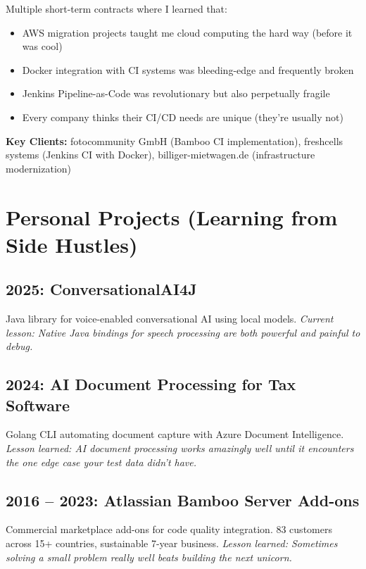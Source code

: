 \documentclass[11pt,a4paper]{article}
\begin{document}
Multiple short-term contracts where I learned that:
\begin{itemize}[leftmargin=15pt, topsep=0pt, itemsep=1pt]
\item AWS migration projects taught me cloud computing the hard way (before it was cool)
\item Docker integration with CI systems was bleeding-edge and frequently broken
\item Jenkins Pipeline-as-Code was revolutionary but also perpetually fragile
\item Every company thinks their CI/CD needs are unique (they're usually not)
\end{itemize}

\textbf{Key Clients:} fotocommunity GmbH (Bamboo CI implementation), freshcells systems (Jenkins CI with Docker), billiger-mietwagen.de (infrastructure modernization)

\vspace{6pt}

\section{Personal Projects (Learning from Side Hustles)}

\subsection{2025: ConversationalAI4J}
Java library for voice-enabled conversational AI using local models. \textit{Current lesson: Native Java bindings for speech processing are both powerful and painful to debug.}

\subsection{2024: AI Document Processing for Tax Software}
Golang CLI automating document capture with Azure Document Intelligence. \textit{Lesson learned: AI document processing works amazingly well until it encounters the one edge case your test data didn't have.}

\subsection{2016 -- 2023: Atlassian Bamboo Server Add-ons}
Commercial marketplace add-ons for code quality integration. 83 customers across 15+ countries, sustainable 7-year business. \textit{Lesson learned: Sometimes solving a small problem really well beats building the next unicorn.}
\end{document}
